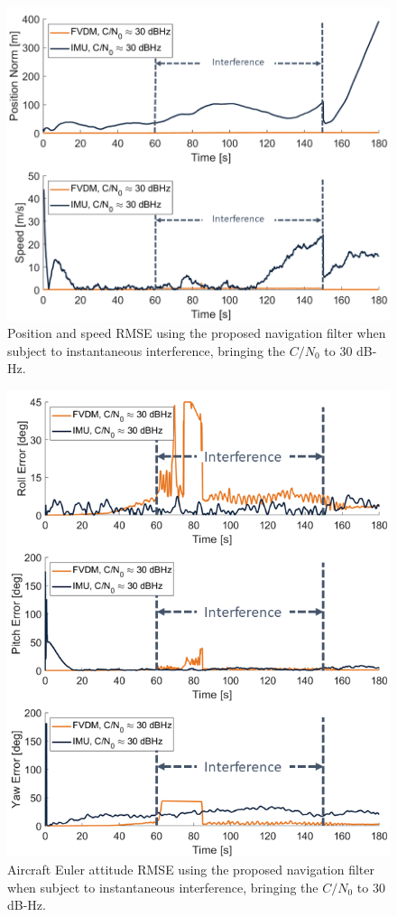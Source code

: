 \documentclass[12pt]{report}
\begin{document}
\begin{figure}[!ht]
  \centering
  \includegraphics[width=0.75\linewidth]{Figures/Results/trajectoryfigure/Slide17.PNG}
  \caption{Position and speed RMSE using the proposed navigation filter when subject to instantaneous interference, bringing the \(C/N_0\) to \(30\) dB-Hz.}\label{fig:PosVel30}
\end{figure}


\begin{figure}[!ht]
  \centering
  \includegraphics[width=0.75\linewidth]{Figures/Results/trajectoryfigure/Slide5.PNG}
  \caption{Aircraft Euler attitude RMSE using the proposed navigation filter when subject to instantaneous interference, bringing the \(C/N_0\) to \(30\) dB-Hz.}\label{fig:Eul30}
\end{figure}
\end{document}
